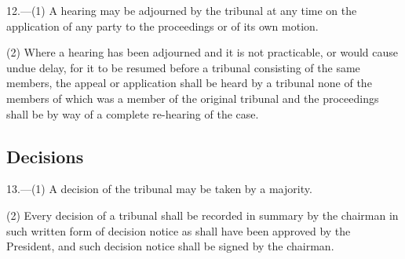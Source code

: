 \documentclass[12pt,a4paper]{article}
\begin{document}
12.—(1) A hearing may be adjourned by the tribunal at any time on the application of any party to the proceedings or of its own motion.

(2) Where a hearing has been adjourned and it is not practicable, or would cause undue delay, for it to be resumed before a tribunal consisting of the same members, the appeal or application shall be heard by a tribunal none of the members of which was a member of the original tribunal and the proceedings shall be by way of a complete re-hearing of the case.

\subsection[13. Decisions]{Decisions}

13.—(1) A decision of the tribunal may be taken by a majority.

%
%

(2) Every decision of a tribunal shall be recorded in summary by the chairman in such written form of decision notice as shall have been approved by the President, and such decision notice shall be signed by the chairman.

%
\end{document}
